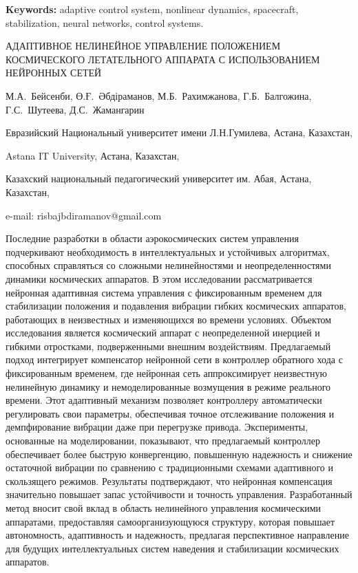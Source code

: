 {\bfseries Keywords:} adaptive control system, nonlinear dynamics,
spacecraft, stabilization, neural networks, control systems.

\begin{header}
АДАПТИВНОЕ НЕЛИНЕЙНОЕ УПРАВЛЕНИЕ ПОЛОЖЕНИЕМ КОСМИЧЕСКОГО ЛЕТАТЕЛЬНОГО АППАРАТА С ИСПОЛЬЗОВАНИЕМ НЕЙРОННЫХ СЕТЕЙ

М.А.~Бейсенби,
Ө.Ғ.~Әбдіраманов\envelope,
М.Б.~Рахимжанова,
Г.Б.~Балгожина,
Г.С.~Шутеева,
Д.С.~Жамангарин
\end{header}

\begin{affil}
Евразийский Национальный университет имени Л.Н.Гумилева, Астана, Казахстан,

Astana IT University, Астана, Казахстан,

Казахский национальный педагогический университет им. Абая, Астана, Казахстан,

e-mail: risbajbdiramanov@gmail.com
\end{affil}

Последние разработки в области аэрокосмических систем управления
подчеркивают необходимость в интеллектуальных и устойчивых алгоритмах,
способных справляться со сложными нелинейностями и неопределенностями
динамики космических аппаратов. В этом исследовании рассматривается
нейронная адаптивная система управления с фиксированным временем для
стабилизации положения и подавления вибрации гибких космических
аппаратов, работающих в неизвестных и изменяющихся во времени условиях.
Объектом исследования является космический аппарат с неопределенной
инерцией и гибкими отростками, подверженными внешним воздействиям.
Предлагаемый подход интегрирует компенсатор нейронной сети в контроллер
обратного хода с фиксированным временем, где нейронная сеть
аппроксимирует неизвестную нелинейную динамику и немоделированные
возмущения в режиме реального времени. Этот адаптивный механизм
позволяет контроллеру автоматически регулировать свои параметры,
обеспечивая точное отслеживание положения и демпфирование вибрации даже
при перегрузке привода. Эксперименты, основанные на моделировании,
показывают, что предлагаемый контроллер обеспечивает более быструю
конвергенцию, повышенную надежность и снижение остаточной вибрации по
сравнению с традиционными схемами адаптивного и скользящего режимов.
Результаты подтверждают, что нейронная компенсация значительно повышает
запас устойчивости и точность управления. Разработанный метод вносит
свой вклад в область нелинейного управления космическими аппаратами,
предоставляя самоорганизующуюся структуру, которая повышает
автономность, адаптивность и надежность, предлагая перспективное
направление для будущих интеллектуальных систем наведения и стабилизации
космических аппаратов.

